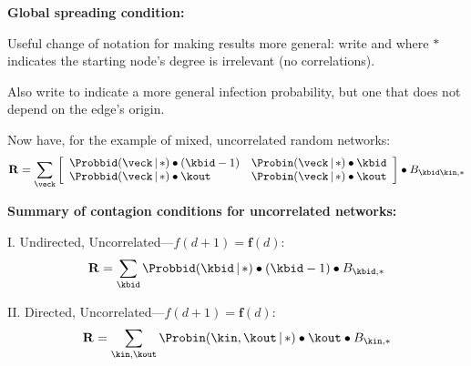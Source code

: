 \begin{frame}[plain]
  \textbf{Global spreading condition:}

  
  
    Useful change of notation for making results more general:
    write 
    and
    where
    $\ast$ indicates the starting node's degree
    is irrelevant (no correlations).

  Also write
  to indicate a more general infection probability,
  but one that does not depend on the edge's origin.

  Now have, for the example of mixed, uncorrelated random networks:
  $$
  \mathbf{R} 
  =
  \sum_{\veck}
  \left[
    \begin{array}{ll}
      \Probbid(\veck\,|\, \ast)
      \bullet
      (\kbid-1)
      &
      \Probin(\veck\,|\, \ast)
      \bullet
      \kbid
      \\
      \Probbid(\veck\,|\, \ast)
      \bullet
      \kout
      &
      \Probin(\veck\,|\, \ast)
      \bullet
      \kout
      \end{array}
    \right]
    \bullet
    B_{\kbid\kin,\ast}
    $$
   




  \textbf{Summary of contagion conditions for uncorrelated networks:}
  
    
      I. Undirected, Uncorrelated---$f(d+1) = \mathbf f(d)$:
      $$
      \mathbf{R} = 
      \sum_{\kbid}
      \Probbid(\kbid\, |\, \ast)
      \bullet
      (\kbid-1)
      \bullet
      B_{\kbid,\ast}
      $$
    
      II. Directed, Uncorrelated---$f(d+1) = \mathbf f(d)$:
      $$
      \mathbf{R} = 
      \sum_{\kin,\kout}
      \Probin(\kin,\kout\, |\, \ast)
      \bullet
      \kout
      \bullet
      B_{\kin,\ast}
      $$
    

\end{frame}
